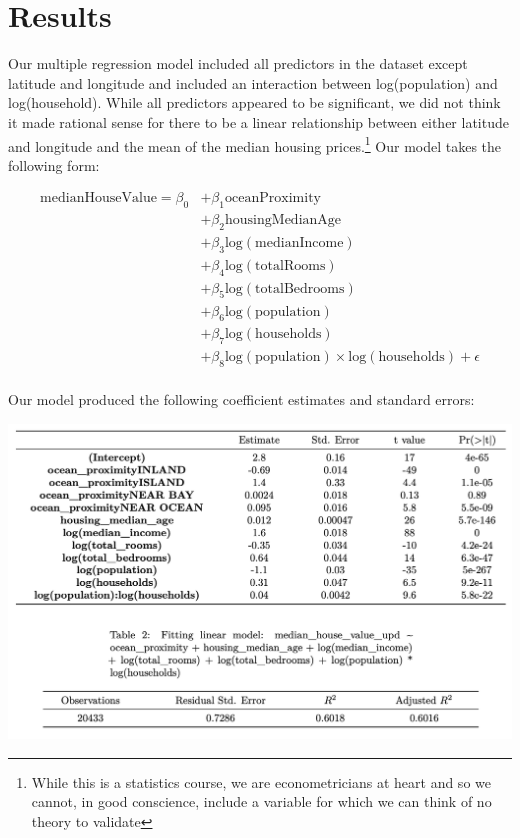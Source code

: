 \documentclass{article}
\begin{document}
\section*{Results}

Our multiple regression model included all predictors in the dataset except latitude and longitude and included an interaction between log(population) and log(household). While all predictors appeared to be significant, we did not think it made rational sense for there to be a linear relationship between either latitude and longitude and the mean of the median housing prices.\footnote{While this is a statistics course, we are econometricians at heart and so we cannot, in good conscience, include a variable for which we can think of no theory to validate} Our model takes the following form: 

\begin{align*}
\mathrm{medianHouseValue} = \beta_{0}
    &+ \beta_{1}  \mathrm{oceanProximity} \\
    &+ \beta_{2}  \mathrm{housingMedianAge} \\
    &+ \beta_{3}  \mathrm{log(medianIncome)} \\
    &+ \beta_{4}  \mathrm{log(totalRooms)} \\
    &+ \beta_{5}  \mathrm{log(totalBedrooms)} \\
    &+ \beta_{6}  \mathrm{log(population)}  \\
    &+ \beta_{7}  \mathrm{log(households)}  \\
    &+ \beta_{8}  \mathrm{log(population) \times log(households)} + \epsilon\\
\end{align*}
\setlength\parindent{0pt}



Our model produced the following coefficient estimates and standard errors:

\begin{center}
    \includegraphics[scale = 0.65]{Regression Table.png}
\end{center}
\end{document}
